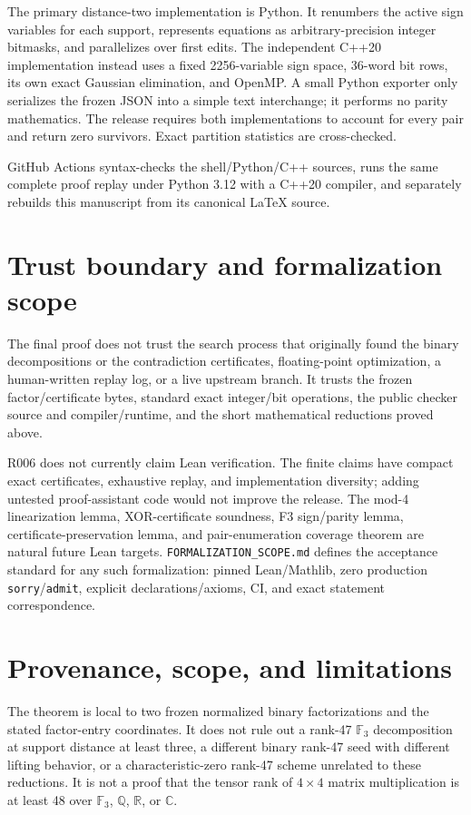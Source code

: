 \documentclass[11pt]{article}
\newcommand{\F}{\mathbb{F}}
\begin{document}
The primary distance-two implementation is Python. It renumbers the active sign variables for each support, represents equations as arbitrary-precision integer bitmasks, and parallelizes over first edits. The independent C++20 implementation instead uses a fixed 2256-variable sign space, 36-word bit rows, its own exact Gaussian elimination, and OpenMP. A small Python exporter only serializes the frozen JSON into a simple text interchange; it performs no parity mathematics. The release requires both implementations to account for every pair and return zero survivors. Exact partition statistics are cross-checked.

GitHub Actions syntax-checks the shell/Python/C++ sources, runs the same complete proof replay under Python 3.12 with a C++20 compiler, and separately rebuilds this manuscript from its canonical LaTeX source.

\section{Trust boundary and formalization scope}

The final proof does not trust the search process that originally found the binary decompositions or the contradiction certificates, floating-point optimization, a human-written replay log, or a live upstream branch. It trusts the frozen factor/certificate bytes, standard exact integer/bit operations, the public checker source and compiler/runtime, and the short mathematical reductions proved above.

R006 does not currently claim Lean verification. The finite claims have compact exact certificates, exhaustive replay, and implementation diversity; adding untested proof-assistant code would not improve the release. The mod-4 linearization lemma, XOR-certificate soundness, F3 sign/parity lemma, certificate-preservation lemma, and pair-enumeration coverage theorem are natural future Lean targets. \texttt{FORMALIZATION\_SCOPE.md} defines the acceptance standard for any such formalization: pinned Lean/Mathlib, zero production \texttt{sorry}/\texttt{admit}, explicit declarations/axioms, CI, and exact statement correspondence.

\section{Provenance, scope, and limitations}

The theorem is local to two frozen normalized binary factorizations and the stated factor-entry coordinates. It does not rule out a rank-47 $\F_3$ decomposition at support distance at least three, a different binary rank-47 seed with different lifting behavior, or a characteristic-zero rank-47 scheme unrelated to these reductions. It is not a proof that the tensor rank of $4\times4$ matrix multiplication is at least 48 over $\F_3$, $\mathbb Q$, $\mathbb R$, or $\mathbb C$.
\end{document}
